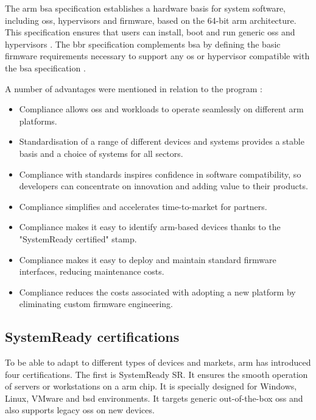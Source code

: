 The \gls{arm} \acrshort{bsa} specification establishes a hardware basis for system software, including \acrshort{os}s, hypervisors and firmware, based on the 64-bit \gls{arm} architecture. This specification ensures that users can install, boot and run generic \acrshort{os}s and hypervisors \cite{bsa_standard}. The \acrshort{bbr} specification complements \acrshort{bsa} by defining the basic firmware requirements necessary to support any \acrshort{os} or hypervisor compatible with the \acrshort{bsa} specification \cite{bbr_standard}.

A number of advantages were mentioned in relation to the program \cite{systemready_program}:
\begin{itemize}
    \item Compliance allows \acrshort{os}s and workloads to operate seamlessly on different \gls{arm} platforms.
    \item Standardisation of a range of different devices and systems provides a stable basis and a choice of systems for all sectors.
    \item Compliance with standards inspires confidence in software compatibility, so developers can concentrate on innovation and adding value to their products.
    \item Compliance simplifies and accelerates time-to-market for partners.
    \item Compliance makes it easy to identify \gls{arm}-based devices thanks to the "SystemReady certified" stamp.
    \item Compliance makes it easy to deploy and maintain standard firmware interfaces, reducing maintenance costs.
    \item Compliance reduces the costs associated with adopting a new platform by eliminating custom firmware engineering.
\end{itemize}

\subsection{SystemReady certifications}
To be able to adapt to different types of devices and markets, \gls{arm} has introduced four certifications. The first is SystemReady SR. It ensures the smooth operation of servers or workstations on a \gls{arm} chip. It is specially designed for Windows, Linux, VMware and \acrfull{bsd} environments. It targets generic out-of-the-box \acrshort{os}s and also supports legacy \acrshort{os}s on new devices. \cite{systemready_program}

